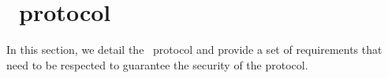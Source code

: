 

\chapter{\zeth~protocol}\label{chap:zeth-protocol}

In this section, we detail the \zeth~protocol and provide a set of requirements that need to be respected to guarantee the security of the protocol.

